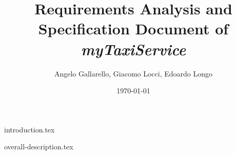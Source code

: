 \documentclass[12pt, a4paper]{article}
\begin{document}
\title{Requirements Analysis and Specification Document of \emph{myTaxiService}}

\author{Angelo Gallarello, Giacomo Locci, Edoardo Longo}
\date{\today}
\maketitle

\newpage

\tableofcontents

\newpage


{introduction.tex}

{overall-description.tex}

\end{document}
